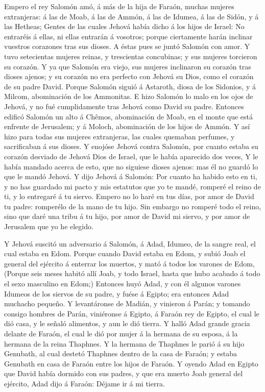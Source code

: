  Empero el rey Salomón amó, á más de la hija de Faraón,
muchas mujeres extranjeras: á las de Moab, á las de Ammón, á las de
Idumea, á las de Sidón, y á las Hetheas;  Gentes de las
cuales Jehová había dicho á los hijos de Israel: No entraréis á ellas,
ni ellas entrarán á vosotros; porque ciertamente harán inclinar vuestros
corazones tras sus dioses. A éstas pues se juntó Salomón con amor.
 Y tuvo setecientas mujeres reinas, y trescientas
concubinas; y sus mujeres torcieron su corazón.  Y ya que
Salomón era viejo, sus mujeres inclinaron su corazón tras dioses ajenos;
y su corazón no era perfecto con Jehová su Dios, como el corazón de su
padre David.  Porque Salomón siguió á Astaroth, diosa de los
Sidonios, y á Milcom, abominación de los Ammonitas.  E hizo
Salomón lo malo en los ojos de Jehová, y no fué cumplidamente tras
Jehová como David su padre.  Entonces edificó Salomón un
alto á Chêmos, abominación de Moab, en el monte que está enfrente de
Jerusalem; y á Moloch, abominación de los hijos de Ammón.  Y
así hizo para todas sus mujeres extranjeras, las cuales quemaban
perfumes, y sacrificaban á sus dioses.  Y enojóse Jehová
contra Salomón, por cuanto estaba su corazón desviado de Jehová Dios de
Israel, que le había aparecido dos veces,  Y le había
mandado acerca de esto, que no siguiese dioses ajenos: mas él no guardó
lo que le mandó Jehová.  Y dijo Jehová á Salomón: Por
cuanto ha habido esto en ti, y no has guardado mi pacto y mis estatutos
que yo te mandé, romperé el reino de ti, y lo entregaré á tu siervo.
 Empero no lo haré en tus días, por amor de David tu padre:
romperélo de la mano de tu hijo.  Sin embargo no romperé
todo el reino, sino que daré una tribu á tu hijo, por amor de David mi
siervo, y por amor de Jerusalem que yo he elegido.

 Y Jehová suscitó un adversario á Salomón, á Adad, Idumeo,
de la sangre real, el cual estaba en Edom.  Porque cuando
David estaba en Edom, y subió Joab el general del ejército á enterrar
los muertos, y mató á todos los varones de Edom,  (Porque
seis meses habitó allí Joab, y todo Israel, hasta que hubo acabado á
todo el sexo masculino en Edom;)  Entonces huyó Adad, y con
él algunos varones Idumeos de los siervos de su padre, y fuése á Egipto;
era entonces Adad muchacho pequeño.  Y levantáronse de
Madián, y vinieron á Parán; y tomando consigo hombres de Parán,
viniéronse á Egipto, á Faraón rey de Egipto, el cual le dió casa, y le
señaló alimentos, y aun le dió tierra.  Y halló Adad grande
gracia delante de Faraón, el cual le dió por mujer á la hermana de su
esposa, á la hermana de la reina Thaphnes.  Y la hermana de
Thaphnes le parió á su hijo Genubath, al cual destetó Thaphnes dentro de
la casa de Faraón; y estaba Genubath en casa de Faraón entre los hijos
de Faraón.  Y oyendo Adad en Egipto que David había dormido
con sus padres, y que era muerto Joab general del ejército, Adad dijo á
Faraón: Déjame ir á mi tierra.

